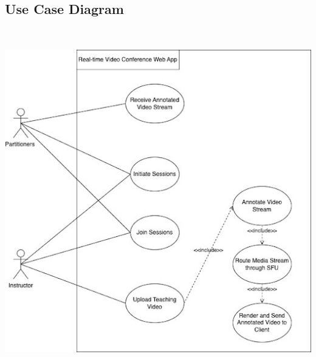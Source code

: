 \documentclass[12pt]{article}
\begin{document}
\subsection{Use Case Diagram}
\includegraphics[width=15cm, height=15cm]{use_case_diagram.jpg}
\end{document}
